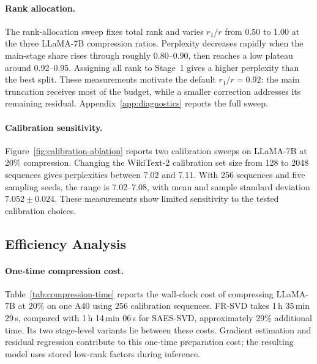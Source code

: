 \documentclass[11pt]{article}
\begin{document}
\paragraph{Rank allocation.}
The rank-allocation sweep fixes total rank and varies $r_1/r$ from 0.50 to 1.00 at the three LLaMA-7B compression ratios. Perplexity decreases rapidly when the main-stage share rises through roughly 0.80--0.90, then reaches a low plateau around 0.92--0.95. Assigning all rank to Stage~1 gives a higher perplexity than the best split. These measurements motivate the default $r_1/r=0.92$: the main truncation receives most of the budget, while a smaller correction addresses its remaining residual. Appendix~\ref{app:diagnostics} reports the full sweep.

\paragraph{Calibration sensitivity.}


Figure~\ref{fig:calibration-ablation} reports two calibration sweeps on LLaMA-7B at 20\% compression. Changing the WikiText-2 calibration set size from 128 to 2048 sequences gives perplexities between 7.02 and 7.11. With 256 sequences and five sampling seeds, the range is 7.02--7.08, with mean and sample standard deviation $7.052\pm0.024$. These measurements show limited sensitivity to the tested calibration choices.

\subsection{Efficiency Analysis}\label{sec:efficiency}

\paragraph{One-time compression cost.}
Table~\ref{tab:compression-time} reports the wall-clock cost of compressing LLaMA-7B at 20\% on one A40 using 256 calibration sequences. FR-SVD takes 1\,h 35\,min 29\,s, compared with 1\,h 14\,min 06\,s for SAES-SVD, approximately 29\% additional time. Its two stage-level variants lie between these costs. Gradient estimation and residual regression contribute to this one-time preparation cost; the resulting model uses stored low-rank factors during inference.


\end{document}
